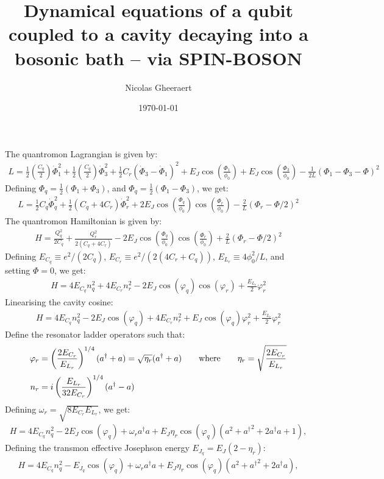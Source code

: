 \documentclass[prb]{revtex4}
\newcommand{\eq}[1]{\begin{align}#1\end{align}}
\begin{document}
\title{Dynamical equations of a qubit coupled to a cavity decaying into a bosonic bath -- via SPIN-BOSON}
\author{Nicolas Gheeraert}
\date{\today}
\maketitle
%
The quantromon Lagrangian is given by:
\eq{
L= \frac{1}{2} \left( \frac{C_q}{2} \right) \dot \Phi_1^2  +  \frac{1}{2} \left( \frac{C_q}{2} \right) \dot \Phi_3^2 +  \frac{1}{2} C_r (\dot \Phi_3 - \dot \Phi_1)^2   +E_J \cos\left(\frac{\Phi_1}{\phi_0}\right) +E_J \cos\left(\frac{\Phi_3}{\phi_0}\right) - \frac{1}{2L}\left(\Phi_1-\Phi_3-\Phi\right)^2
}
%
Defining $\Phi_q = \frac{1}{2} ( \Phi_1 + \Phi_3 )$, and $\Phi_q = \frac{1}{2} ( \Phi_1 - \Phi_3 )$, we get:
%
\eq{
L=\frac{1}{2} C_q\dot \Phi_q^2  +  \frac{1}{2} ( C_q +  4 C_r ) \dot \Phi_r^2   +2E_J \cos\left(\frac{\Phi_q}{\phi_0}\right)\cos\left(\frac{\Phi_r}{\phi_0}\right) - \frac{2}{L}\left(\Phi_r-\Phi/2 \right)^2
}
The quantromon Hamiltonian is given by:
%
\eq{
H= \frac{Q_q^2}{2C_q} +  \frac{Q_r^2}{2(C_q+4 C_r)}  - 2 E_J \cos\left(\frac{\Phi_q}{\phi_0}\right)\cos\left(\frac{\Phi_r}{\phi_0}\right) + \frac{2}{L}(\Phi_r-\Phi/2)^2
}
%
Defining $E_{C_q} \equiv e^2/(2C_q)$, $E_{C_r} \equiv e^2/(2(4C_r+C_q))$, $E_{L_r} \equiv 4\phi_0^2/L$, and setting $\Phi=0$, we get:
%
\eq{
H= 4 E_{C_q} n_q^2 + 4E_{C_r} n_r^2 - 2E_J \cos(\varphi_q)\cos(\varphi_r) + \frac{E_{L_r}}{2} \varphi_r^2
}
Linearising the cavity cosine:
%
\eq{
H= 4 E_{C_q} n_q^2 - 2E_J \cos(\varphi_q)+ 4E_{C_r} n_r^2 +E_J \cos(\varphi_q)\varphi_r^2 + \frac{E_{L_r}}{2} \varphi_r^2
}
%
Define the resonator ladder operators such that:
\eq{
\varphi_r &= \left( \frac{2E_{C_r}}{E_{L_r}} \right)^{1/4} ( a^\dag + a ) = \sqrt{\eta_r} ( a^\dag + a ) \quad \quad {\rm where}  \quad \quad \eta_r= \sqrt{\frac{2E_{C_r}}{E_{L_r}}}  \notag \\
 n_r &= i\left( \frac{E_{L_r}}{32E_{C_r}} \right)^{1/4}  ( a^\dag - a) 
 }
Defining $\omega_r=\sqrt{8E_{C_r}E_{L_r}}$, we get:
%
\eq{
H= 4 E_{C_q} n_q^2 - 2E_J \cos(\varphi_q)+ \omega_r a^\dag a + E_J\eta_r\cos(\varphi_q)(a^2 + {a^\dag}^2 +  2 a^\dag a +1 ),
}
Defining the transmon effective Josephson energy $E_{J_q} = E_J(2 - \eta_r)$:
%
\eq{
H= 4 E_{C_q} n_q^2 - E_{J_q} \cos(\varphi_q) + \omega_r a^\dag a + E_J\eta_r \cos(\varphi_q)(a^2 + {a^\dag}^2 +  2 a^\dag a ),
}
\end{document}
